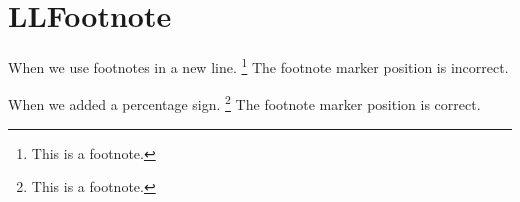\section{LLFootnote}

When we use footnotes in a new line.
\footnote{This is a footnote.}
The footnote marker position is incorrect.

When we added a percentage sign.%
\footnote{This is a footnote.}
The footnote marker position is correct.
